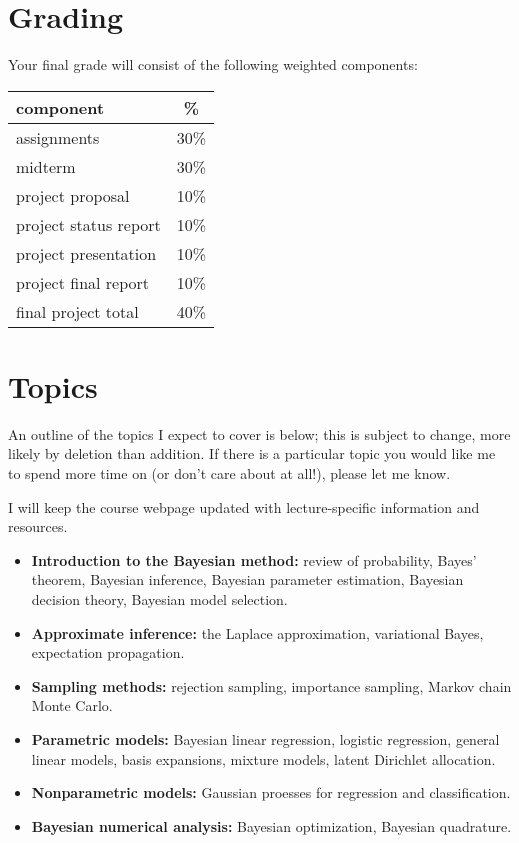 \documentclass{article}
\begin{document}
\section*{Grading}

Your final grade will consist of the following weighted components:
\begin{center}
  \begin{tabular}{lc}
    \toprule
    component                    &   \% \\
    \midrule
    assignments                  & 30\% \\
    midterm                      & 30\% \\
    project proposal             & 10\% \\
    project status report        & 10\% \\
    project presentation         & 10\% \\
    project final report         & 10\% \\
    \midrule
    final project total          & 40\% \\
    \bottomrule
  \end{tabular}
\end{center}

\section*{Topics}

An outline of the topics I expect to cover is below; this is subject
to change, more likely by deletion than addition.  If there is a
particular topic you would like me to spend more time on (or don't
care about at all!), please let me know.

I will keep the course webpage updated with lecture-specific
information and resources.

\begin{itemize}
\item \textbf{Introduction to the Bayesian method:} review of
  probability, Bayes' theorem, Bayesian inference, Bayesian parameter
  estimation, Bayesian decision theory, Bayesian model selection.
\item \textbf{Approximate inference:} the Laplace approximation,
  variational Bayes, expectation propagation.
\item \textbf{Sampling methods:} rejection sampling, importance
  sampling, Markov chain Monte Carlo.
\item \textbf{Parametric models:} Bayesian linear regression, logistic
  regression, general linear models, basis expansions, mixture models,
  latent Dirichlet allocation.
\item \textbf{Nonparametric models:} Gaussian proesses for regression
  and classification.
\item \textbf{Bayesian numerical analysis:} Bayesian optimization,
  Bayesian quadrature.
\end{itemize}
\end{document}

